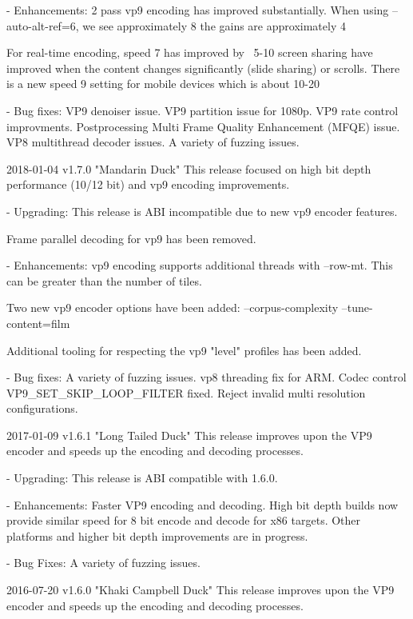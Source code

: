 \begin{DoxyVerbInclude}
  - Enhancements:
    2 pass vp9 encoding has improved substantially. When using --auto-alt-ref=6,
    we see approximately 8%
    the gains are approximately 4%

    For real-time encoding, speed 7 has improved by ~5-10%
    screen sharing have improved when the content changes significantly (slide
    sharing) or scrolls. There is a new speed 9 setting for mobile devices which
    is about 10-20%

  - Bug fixes:
    VP9 denoiser issue.
    VP9 partition issue for 1080p.
    VP9 rate control improvments.
    Postprocessing Multi Frame Quality Enhancement (MFQE) issue.
    VP8 multithread decoder issues.
    A variety of fuzzing issues.

2018-01-04 v1.7.0 "Mandarin Duck"
  This release focused on high bit depth performance (10/12 bit) and vp9
  encoding improvements.

  - Upgrading:
    This release is ABI incompatible due to new vp9 encoder features.

    Frame parallel decoding for vp9 has been removed.

  - Enhancements:
    vp9 encoding supports additional threads with --row-mt. This can be greater
    than the number of tiles.

    Two new vp9 encoder options have been added:
      --corpus-complexity
      --tune-content=film

    Additional tooling for respecting the vp9 "level" profiles has been added.

  - Bug fixes:
    A variety of fuzzing issues.
    vp8 threading fix for ARM.
    Codec control VP9_SET_SKIP_LOOP_FILTER fixed.
    Reject invalid multi resolution configurations.

2017-01-09 v1.6.1 "Long Tailed Duck"
  This release improves upon the VP9 encoder and speeds up the encoding and
  decoding processes.

  - Upgrading:
    This release is ABI compatible with 1.6.0.

  - Enhancements:
    Faster VP9 encoding and decoding.
    High bit depth builds now provide similar speed for 8 bit encode and decode
    for x86 targets. Other platforms and higher bit depth improvements are in
    progress.

  - Bug Fixes:
    A variety of fuzzing issues.

2016-07-20 v1.6.0 "Khaki Campbell Duck"
  This release improves upon the VP9 encoder and speeds up the encoding and
  decoding processes.


\end{DoxyVerbInclude}

